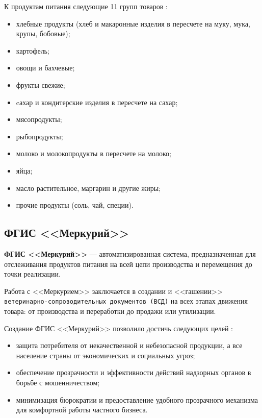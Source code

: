 \clearpage

К продуктам питания следующие 11 групп товаров \cite{info_consumer_basket2}:

\begin{itemize}[label=--]
	\item хлебные продукты (хлеб и макаронные изделия в пересчете на муку, мука, крупы, бобовые);
	\item картофель;
	\item овощи и бахчевые;
	\item фрукты свежие;
	\item cахар и кондитерские изделия в пересчете на сахар;
	\item мясопродукты;
	\item рыбопродукты;
	\item молоко и молокопродукты в пересчете на молоко;
	\item яйца;
	\item масло растительное, маргарин и другие жиры;
	\item прочие продукты (соль, чай, специи).
\end{itemize}

\subsection{ФГИС <<Меркурий>>}

\textbf{ФГИС <<Меркурий>>} --- автоматизированная система, предназначенная для отслеживания продуктов питания на всей цепи производства и перемещения до точки реализации.

Работа с <<Меркурием>> заключается в создании и <<гашении>> \texttt{ветеринарно-сопроводительных документов (ВСД)} на всех этапах движения товара: от производства и переработки до продажи или утилизации.

\clearpage

Создание ФГИС <<Меркурий>> позволило достичь следующих целей \cite{info_mercury}:

\begin{itemize}[label=--]
	\item защита потребителя от некачественной и небезопасной продукции, а все население страны от экономических и социальных угроз;
	\item обеспечение прозрачности и эффективности действий надзорных органов в борьбе с мошенничеством;
	\item минимизация бюрократии и предоставление удобного прозрачного механизма для комфортной работы частного бизнеса.
\end{itemize}


